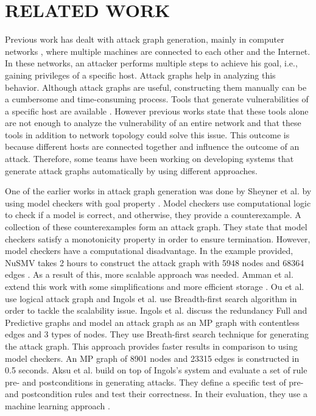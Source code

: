 \section{RELATED WORK}
\label{chap:related_work}

Previous work has dealt with attack graph generation, mainly in computer networks \cite{ingols2006practical, sheyner2002automated, ritchey2000using, ou2006scalable}, where multiple machines are connected to each other and the Internet. In these networks, an attacker performs multiple steps to achieve his goal, i.e., gaining privileges of a specific host. Attack graphs help in analyzing this behavior. Although attack graphs are useful, constructing them manually can be a cumbersome and time-consuming process. Tools that generate vulnerabilities of a specific host are available \cite{clair, artz2002netspa, farmer1990cops}. However previous works state that these tools alone are not enough to analyze the vulnerability of an entire network and that these tools in addition to network topology could solve this issue. This outcome is because different hosts are connected together and influence the outcome of an attack. Therefore, some teams have been working on developing systems that generate attack graphs automatically by using different approaches.

One of the earlier works in attack graph generation was done by Sheyner et al. by using model checkers with goal property \cite{sheyner2002automated}. Model checkers use computational logic to check if a model is correct, and otherwise, they provide a counterexample. A collection of these counterexamples form an attack graph. They state that model checkers satisfy a monotonicity property in order to ensure termination. However, model checkers have a computational disadvantage. In the example provided, NuSMV takes 2 hours to construct the attack graph with 5948 nodes and 68364 edges \cite{sheyner2002automated}. As a result of this, more scalable approach was needed. Amman et al. extend this work with some simplifications and more efficient storage \cite{ritchey2000using}. Ou et al. use logical attack graph \cite{ou2006scalable} and Ingols \cite{ingols2006practical} et al. use Breadth-first search algorithm in order to tackle the scalability issue. Ingols et al. discuss the redundancy Full and Predictive graphs and model an attack graph as an MP graph with contentless edges and 3 types of nodes. They use Breath-first search technique for generating the attack graph. This approach provides faster results in comparison to using model checkers. An MP graph of 8901 nodes and 23315 edges is constructed in 0.5 seconds. Aksu et al. build on top of Ingols's system and evaluate a set of rule pre- and postconditions in generating attacks. They define a specific test of pre- and postcondition rules and test their correctness. In their evaluation, they use a machine learning approach \cite{aksu2018automated}.

